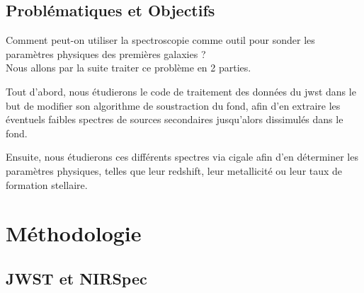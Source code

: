 \documentclass[12pt, a4paper]{article}
\begin{document}
\subsection{Problématiques et Objectifs}

Comment peut-on utiliser la spectroscopie comme outil pour sonder les paramètres physiques des premières galaxies ?\\

Nous allons par la suite traiter ce problème en 2 parties.

Tout d'abord, nous étudierons le code de traitement des données du \gls{jwst} dans le but de modifier son algorithme de soustraction du fond, afin d'en extraire les éventuels faibles spectres de sources secondaires jusqu'alors dissimulés dans le fond.

Ensuite, nous étudierons ces différents spectres via \gls{cigale} afin d'en déterminer les paramètres physiques, telles que leur redshift, leur metallicité ou leur taux de formation stellaire.

\section{Méthodologie}

\subsection{JWST et NIRSpec}
\end{document}
